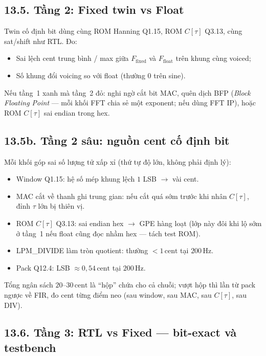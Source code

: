\subsection*{13.5. Tầng 2: Fixed twin vs Float}

Twin cố định bit dùng cùng ROM Hanning Q1.15, ROM $C[\tau]$ Q3.13, cùng sat/shift như RTL. Đo:
\begin{itemize}[leftmargin=1.4em]
    \item Sai lệch cent trung bình / max giữa $F_{\mathrm{fixed}}$ và $F_{\mathrm{float}}$ trên khung cùng voiced;
    \item Số khung đổi voicing so với float (thường $0$ trên sine).
\end{itemize}
Nếu tầng~1 xanh mà tầng~2 đỏ: nghi ngờ cắt bit MAC, quên dịch BFP (\emph{Block Floating Point} --- mỗi khối FFT chia sẻ một exponent; nếu dùng FFT IP), hoặc ROM $C[\tau]$ sai endian trong hex.

\subsection*{13.5b. Tầng 2 sâu: nguồn cent cố định bit}

Mỗi khối góp sai số lượng tử xấp xỉ (thứ tự độ lớn, không phải định lý):
\begin{itemize}[leftmargin=1.4em]
  \item Window Q1.15: hệ số mép khung lệch $1$ LSB $\to$ vài cent.
  \item MAC cắt về thanh ghi trung gian: nếu cắt quá sớm trước khi nhân $C[\tau]$, đỉnh $\tau$ lớn bị thiên vị.
  \item ROM $C[\tau]$ Q3.13: sai endian hex $\to$ GPE hàng loạt (lớp này đôi khi lộ sớm ở tầng~1 nếu float cũng đọc nhầm hex --- tách test ROM).
  \item LPM\_DIVIDE làm tròn quotient: thường $<1\,\text{cent}$ tại $200\,\text{Hz}$.
  \item Pack Q12.4: LSB $\approx 0{,}54\,\text{cent}$ tại $200\,\text{Hz}$.
\end{itemize}
Tổng ngân sách $20$--$30\,\text{cent}$ là ``hộp'' chứa cho cả chuỗi; vượt hộp thì lần từ pack ngược về FIR, đo cent từng điểm neo (sau window, sau MAC, sau $C[\tau]$, sau DIV).

\subsection*{13.6. Tầng 3: RTL vs Fixed --- bit-exact và testbench}

